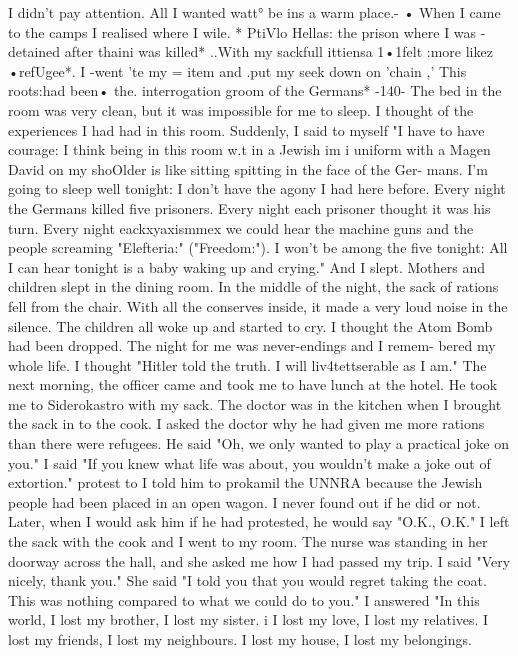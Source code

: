 I didn't pay attention.
All I wanted 
watt° be ins a warm place.- • When I came to the camps I realised where I wile.
* PtiVlo 
Hellas: the prison where I was -detained after thaini was killed* ..With my sackfull 
ittiensa 1•1felt :more likez •refUgee*.
I -went 'te my = item and .put my seek down on 
'chain ,' This roots:had been• the.
interrogation groom of the Germans* 
-140- 
The bed in the room was very clean, but it was impossible for me to sleep.
I thought of the experiences I had had in this room.
Suddenly, I said to myself 
"I have to have courage: I think being in this room w.t in a Jewish im i uniform 
with a Magen David on my shoOlder is like sitting spitting in the face of the Ger-
mans.
I'm going to sleep well tonight: I don't have the agony I had here before.
Every night the Germans killed five prisoners.
Every night each prisoner thought it 
was his turn.
Every night eackxyaxismmex we could hear the machine guns and the people 
screaming "Elefteria:" ("Freedom:").
I won't be among the five tonight: All I can 
hear tonight is a baby waking up and crying."
And I slept.
Mothers and children slept in the dining room.
In the middle of the night, the 
sack of rations fell from the chair.
With all the conserves inside, it made a very 
loud noise in the silence.
The children all woke up and started to cry.
I thought 
the Atom Bomb had been dropped.
The night for me was never-endings and I remem-
bered my whole life.
I thought "Hitler told the truth.
I will liv4tettserable 
as I am."
The next morning, the officer came and took me to have lunch at the hotel.
He 
took me to Siderokastro with my sack.
The doctor was in the kitchen when I brought 
the sack in to the cook.
I asked the doctor why he had given me more rations than 
there were refugees.
He said "Oh, we only wanted to play a practical joke on you."
I said "If you knew what life was about, you wouldn't make a joke out of extortion."
protest to 
I told him to prokamil the UNNRA because the Jewish people had been placed in an open 
wagon.
I never found out if he did or not.
Later, when I would ask him if he had 
protested, he would say "O.K., O.K."
I left the sack with the cook and I went to my room.
The nurse was standing 
in her doorway across the hall, and she asked me how I had passed my trip.
I said 
"Very nicely, thank you."
She said "I told you that you would regret taking the 
coat.
This was nothing compared to what we could do to you."
I answered "In this 
world, I lost my brother, I lost my sister.
i I lost my love, I lost my relatives.
I lost my friends, I lost my neighbours.
I lost my house, I lost my belongings.
